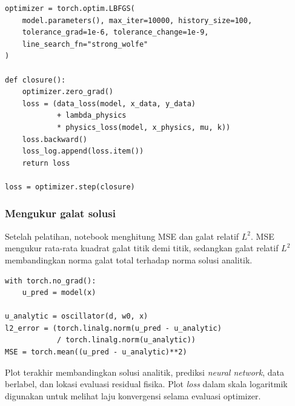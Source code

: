 \documentclass[12pt, letterpaper]{article}
\begin{document}
\begin{lstlisting}[caption={Penyempurnaan solusi menggunakan L-BFGS}]
optimizer = torch.optim.LBFGS(
    model.parameters(), max_iter=10000, history_size=100,
    tolerance_grad=1e-6, tolerance_change=1e-9,
    line_search_fn="strong_wolfe"
)

def closure():
    optimizer.zero_grad()
    loss = (data_loss(model, x_data, y_data)
            + lambda_physics
            * physics_loss(model, x_physics, mu, k))
    loss.backward()
    loss_log.append(loss.item())
    return loss

loss = optimizer.step(closure)
\end{lstlisting}

\subsubsection{Mengukur galat solusi}

Setelah pelatihan, notebook menghitung MSE dan galat relatif $L^2$. MSE
mengukur rata-rata kuadrat galat titik demi titik, sedangkan galat relatif
$L^2$ membandingkan norma galat total terhadap norma solusi analitik.

\begin{lstlisting}[caption={Metrik evaluasi osilator}]
with torch.no_grad():
    u_pred = model(x)

u_analytic = oscillator(d, w0, x)
l2_error = (torch.linalg.norm(u_pred - u_analytic)
            / torch.linalg.norm(u_analytic))
MSE = torch.mean((u_pred - u_analytic)**2)
\end{lstlisting}

Plot terakhir membandingkan solusi analitik, prediksi \textit{neural network}, data berlabel,
dan lokasi evaluasi residual fisika. Plot \textit{loss} dalam skala logaritmik
digunakan untuk melihat laju konvergensi selama evaluasi optimizer.
\end{document}
